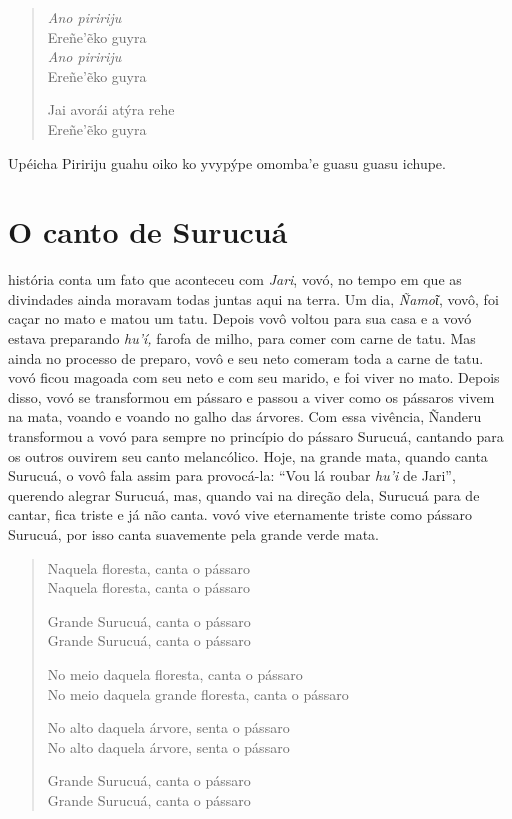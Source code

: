\begin{verse}
\textit{Ano piririju}\\
Ereñe'ẽko guyra\\
\textit{Ano piririju}\\
Ereñe'ẽko guyra
       
Jai avorái atýra rehe\\
Ereñe'ẽko guyra
\end{verse}

Upéicha Piririju guahu oiko ko yvypýpe omomba'e guasu guasu ichupe.

\chapter{O canto de Surucuá}

 história conta um fato que aconteceu com \textit{Jari}, vovó, no
tempo em que as divindades ainda moravam todas juntas aqui na terra. Um
dia, \textit{Ñamoῖ}, vovô, foi caçar no mato e matou um tatu. Depois vovô
voltou para sua casa e a vovó estava preparando \textit{hu'í,} farofa de
milho, para comer com carne de tatu. Mas ainda no processo de preparo,
vovô e seu neto comeram toda a carne de tatu. vovó ficou magoada com seu
neto e com seu marido, e foi viver no mato. Depois disso, vovó se
transformou em pássaro e passou a viver como os pássaros vivem na mata,
voando e voando no galho das árvores. Com essa vivência, Ñanderu
transformou a vovó para sempre no princípio do pássaro Surucuá, cantando
para os outros ouvirem seu canto melancólico. Hoje, na grande mata,
quando canta Surucuá, o vovô fala assim para provocá-la: ``Vou lá roubar
\textit{hu'i} de Jari'', querendo alegrar Surucuá, mas, quando vai na
direção dela, Surucuá para de cantar, fica triste e já não canta. vovó
vive eternamente triste como pássaro Surucuá, por isso canta suavemente
pela grande verde mata.

\begin{verse}
Naquela floresta, canta o pássaro\\
Naquela floresta, canta o pássaro

Grande Surucuá, canta o pássaro\\
Grande Surucuá, canta o pássaro

No meio daquela floresta, canta o pássaro\\
No meio daquela grande floresta, canta o  pássaro

\pagebreak
No alto daquela árvore, senta o pássaro\\
No alto daquela árvore, senta o pássaro

Grande Surucuá, canta o pássaro\\
Grande Surucuá, canta o pássaro
\end{verse}

